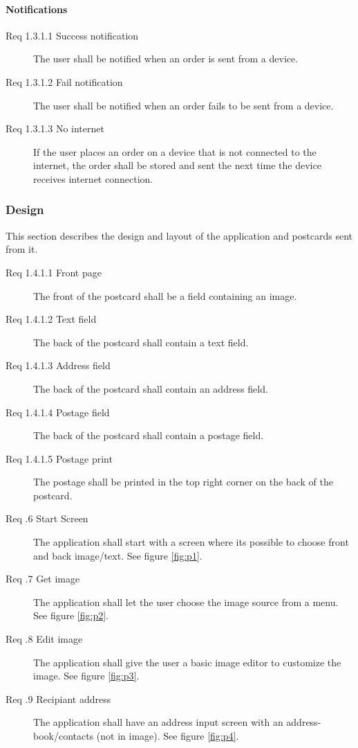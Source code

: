 \documentclass[10pt,a4paper]{article}
\newcommand{\tsss}{\thesubsubsection}
\begin{document}
\paragraph{Notifications}
\begin{description}

\item [Req 1.3.1.1 Success notification] The user shall be notified when an order is sent from a device.
\item [Req 1.3.1.2 Fail notification] The user shall be notified when an order fails to be sent from a device.

\item [Req 1.3.1.3 No internet] If the user places an order on a device that is not connected to the internet, the order shall be stored and sent the next time the device receives internet connection. 
\end{description}
\subsubsection{Design}
This section describes the design and layout of the application and postcards sent from it. 
\begin {description}
\item [Req 1.4.1.1 Front page] The front of the postcard shall be a field containing an image.
\item [Req 1.4.1.2 Text field] The back of the postcard shall contain a text field.
\item [Req 1.4.1.3 Address field] The back of the postcard shall contain an address field.
\item [Req 1.4.1.4 Postage field] The back of the postcard shall contain a postage field. 
\item [Req 1.4.1.5 Postage print] The postage shall be printed in the top right corner on the back of the postcard. 


\item[Req \tsss.6 Start Screen] The application shall start with a screen where its possible to choose front and back image/text. See figure \ref{fig:p1}.
\item[Req \tsss.7 Get image] The application shall let the user choose the image source from a menu. See figure \ref{fig:p2}.
\item[Req \tsss.8 Edit image]The application shall give the user a basic image editor to customize the image. See figure \ref{fig:p3}.
\item[Req \tsss.9 Recipiant address] The application shall have an address input screen with an address-book/contacts (not in image). See figure \ref{fig:p4}.
\end{description}
\end{document}
